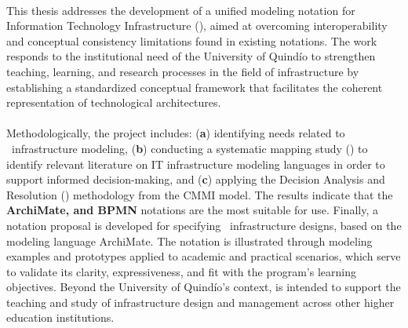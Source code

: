 \label{cap:abstract}
\mbox{}\\
\noindent
This thesis addresses the development of a unified modeling notation for Information Technology Infrastructure (\NDITI), aimed at overcoming interoperability and conceptual consistency limitations found in existing notations. The work responds to the institutional need of the University of Quindío to strengthen teaching, learning, and research processes in the field of \IT infrastructure by establishing a standardized conceptual framework that facilitates the coherent representation of technological architectures.
\\\\
Methodologically, the project includes: (\textbf{a}) identifying needs related to \IT~infrastructure modeling, (\textbf{b}) conducting a systematic mapping study (\SMS) to identify relevant literature on IT infrastructure modeling languages in order to support informed decision-making, and (\textbf{c}) applying the Decision Analysis and Resolution (\DAR) methodology from the CMMI model. The results indicate that the \textbf{ArchiMate, \UML{} and BPMN} notations are the most suitable for use. Finally, a notation proposal is developed for specifying \IT~infrastructure designs, based on the modeling language ArchiMate. The notation is illustrated through modeling examples and prototypes applied to academic and practical scenarios, which serve to validate its clarity, expressiveness, and fit with the program's learning objectives. Beyond the University of Quindío's context, \NDITI is intended to support the teaching and study of \IT infrastructure design and management across other higher education institutions.
